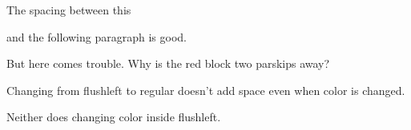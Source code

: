 \documentclass{article}
\begin{document}
    The spacing between this
    \begin{flushleft}
    and the following paragraph is good.
    \end{flushleft}%
    \color{red}%
    \begin{flushleft} But here comes trouble. Why is the red block two parskips away?
    \end{flushleft}
    \color{blue}%
    Changing from flushleft to regular doesn't add space even when color is changed.
    \begin{flushleft} 
    \color{green}%
    Neither does changing color inside flushleft.
    \end{flushleft}

    
\end{document}
